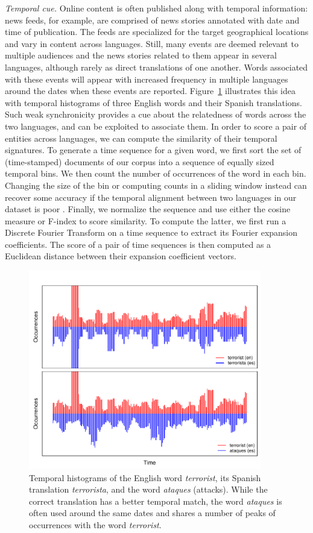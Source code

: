 \documentclass{article}
\newcommand{\mtodo}[1]{}
\newcommand{\figref}[1]{Figure~\ref{#1}}
\begin{document}
\noindent\emph{Temporal cue.} Online content is often published along with temporal information: news feeds, for example, are comprised of news stories annotated with date and time of publication.  The feeds are specialized for the target geographical locations and vary in content across languages.  Still, many events are deemed relevant to multiple audiences and the news stories related to them appear in several languages, although rarely as direct translations of one another.  Words associated with these events will appear with increased frequency in multiple languages around the dates when these events are reported.  \figref{fig:temporal} illustrates this idea with temporal histograms of three English words and their Spanish translations. Such weak synchronicity provides a cue about the relatedness of words across the two languages, and can be exploited to associate them.  In order to score a pair of entities across languages, we can compute the similarity of their temporal signatures.\mtodo{\figref{fig:temporal} is from Europarl, add the one from the proposal instead.}  To generate a time sequence for a given word, we first sort the set of (time-stamped) documents of our corpus into a sequence of equally sized temporal bins.  We then count the number of occurrences of the word in each bin.  Changing the size of the bin or computing counts in a sliding window instead can recover some accuracy if the temporal alignment between two languages in our dataset is poor \cite{Klementiev:2006b}.  Finally, we normalize the sequence and use either the cosine measure or F-index \cite{Hetland:2004} to score similarity. To compute the latter, we first run a Discrete Fourier Transform on a time sequence to extract its Fourier expansion coefficients. The score of a pair of time sequences is then computed as a Euclidean distance between their expansion coefficient vectors. \\

\begin{figure}[h]
\centerline{\mbox{\includegraphics[width=4in]{figures/temporal/temporal}}}
\caption{Temporal histograms of the English word {\em terrorist}, its Spanish translation {\em terrorista}, and the word {\em ataques} (attacks). While the correct translation has a better temporal match, the word {\em ataques} is often used around the same dates and shares a number of peaks of occurrences with the word {\em terrorist}.}
\label{fig:temporal}
\end{figure}
\end{document}
